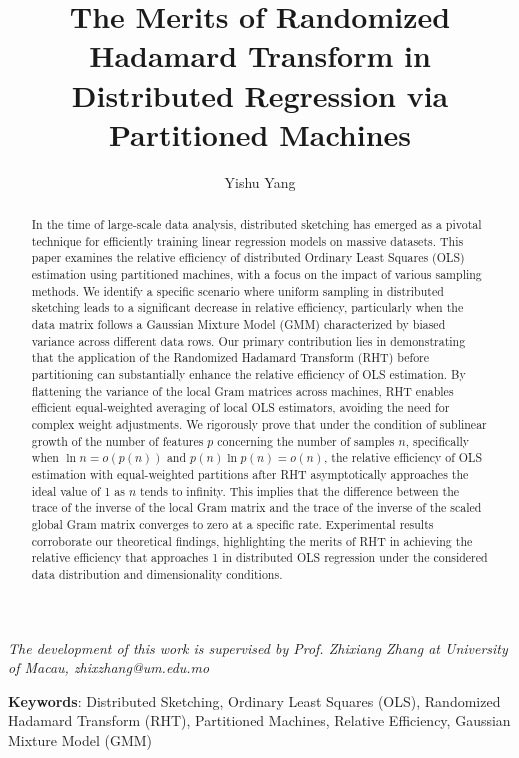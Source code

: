 \documentclass[11pt]{article}
\title{The Merits of Randomized Hadamard Transform in Distributed Regression via Partitioned Machines}
\author{Yishu Yang}
\affil{Center for Data Science, New York University, New York. \texttt{fergie.yang@nyu.edu}}
\date{} %
\numberwithin{equation}{section}
\theoremstyle{plain}
\theoremstyle{definition}
\theoremstyle{remark}
\newcommand{\keywords}[1]{\noindent\textbf{Keywords}: #1}
\newcommand{\dedicated}[1]{\begin{center}\emph{#1}\end{center}}
\begin{document}
\thispagestyle{firstpage}
\maketitle
\dedicated{The development of this work is supervised by Prof. Zhixiang Zhang at University of Macau, zhixzhang@um.edu.mo}
\keywords{Distributed Sketching, Ordinary Least Squares (OLS), Randomized Hadamard Transform (RHT), Partitioned Machines, Relative Efficiency, Gaussian Mixture Model (GMM)}
\begin{abstract}
In the time of large-scale data analysis, distributed sketching has emerged as a pivotal technique for efficiently training linear regression models on massive datasets. This paper examines the relative efficiency of distributed Ordinary Least Squares (OLS) estimation using partitioned machines, with a focus on the impact of various sampling methods. We identify a specific scenario where uniform sampling in distributed sketching leads to a significant decrease in relative efficiency, particularly when the data matrix follows a Gaussian Mixture Model (GMM) characterized by biased variance across different data rows. Our primary contribution lies in demonstrating that the application of the Randomized Hadamard Transform (RHT) before partitioning 
can substantially enhance the relative efficiency of OLS estimation. By flattening the variance of the local Gram matrices across machines, RHT enables efficient equal-weighted averaging of local OLS estimators, avoiding the need for complex weight adjustments. We rigorously prove that under the condition of sublinear growth of the number of features $p$ concerning the number of samples $n$,
 specifically when $\ln n = o(p(n))$ and $p(n)\ln p(n) = o(n)$, the relative efficiency of OLS estimation with equal-weighted partitions after RHT asymptotically approaches the ideal value of 1 as $n$ tends to infinity. 
 This implies that the difference between the trace of the inverse of the local Gram matrix and the trace of the inverse of the scaled global Gram matrix converges to zero at a specific rate. Experimental results corroborate our theoretical findings, highlighting the merits of RHT in achieving the relative efficiency that approaches 1 in distributed OLS regression under the considered data distribution and dimensionality conditions.
\end{abstract}

\end{document}
